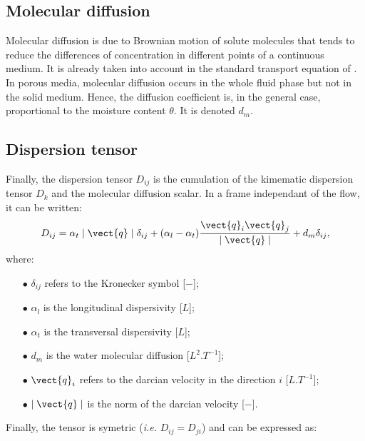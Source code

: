 \subsection{Molecular diffusion}
Molecular diffusion is due to Brownian motion of solute molecules that tends to reduce the differences
of concentration in different points of a continuous medium.
It is already taken into account in the standard transport equation of \CS.
In porous media, molecular diffusion occurs in the whole fluid phase but not in the solid medium. Hence, the diffusion coefficient
is, in the general case, proportional to the moisture content $\theta$. It is denoted $d_m$.

\subsection{Dispersion tensor}
Finally, the dispersion tensor $D_{ij}$ is the cumulation of the kimematic dispersion tensor $D_k$ and the molecular diffusion scalar.
In a frame independant of the flow, it can be written:
\begin{equation}\label{formul_disp}
 D_{ij}= \alpha_t \mid \vect{q} \mid \delta_{ij} + (\alpha_l - \alpha_t) \frac{\vect{q}_i \vect{q}_j}{\mid \vect{q} \mid} + d_m \delta_{ij},
\end{equation}
where:
\begin{itemize}
 \item[$\bullet$] $\delta_{ij}$ refers to the Kronecker symbol [$-$];
 \item[$\bullet$] $\alpha_l$ is the longitudinal dispersivity [$L$];
 \item[$\bullet$] $\alpha_t$ is the transversal dispersivity [$L$];
 \item[$\bullet$] $d_m$ is the water molecular diffusion [$L^2.T^{-1}$];
 \item[$\bullet$] $\vect{q}_i$ refers to the darcian velocity in the direction $i$ [$L.T^{-1}$];
 \item[$\bullet$] $\mid \vect{q} \mid$ is the norm of the darcian velocity [$-$].
\end{itemize}
Finally, the tensor is symetric (\emph{i.e.} $D_{ij}=D_{ji}$) and can be expressed as:
